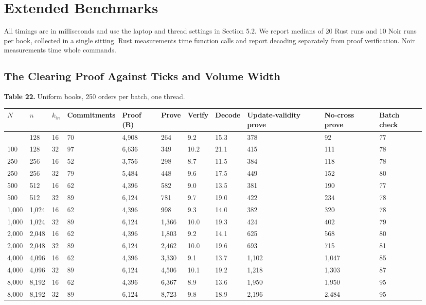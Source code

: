 
\section{Extended Benchmarks}

All timings are in milliseconds and use the laptop and thread settings in Section 5.2. We report medians of 20 Rust runs and 10 Noir runs per book, collected in a single sitting. Rust measurements time function calls and report decoding separately from proof verification. Noir measurements time whole commands.

\subsection{The Clearing Proof Against Ticks and Volume Width}

\textbf{Table 22.} Uniform books, 250 orders per batch, one thread.

\begin{longtable}[]{@{}lllllllllll@{}}
\toprule\noalign{}
\(N\) & \(n\) & \(k_{in}\) & Commitments & Proof (B) & Prove & Verify & Decode & Update-validity prove & No-cross prove & Batch check \\
\midrule\noalign{}
\endhead
\bottomrule\noalign{}
\endlastfoot
100 & 128 & 16 & 70 & 4,908 & 264 & 9.2 & 15.3 & 378 & 92 & 77 \\
100 & 128 & 32 & 97 & 6,636 & 349 & 10.2 & 21.1 & 415 & 111 & 78 \\
250 & 256 & 16 & 52 & 3,756 & 298 & 8.7 & 11.5 & 384 & 118 & 78 \\
250 & 256 & 32 & 79 & 5,484 & 448 & 9.6 & 17.5 & 449 & 152 & 80 \\
500 & 512 & 16 & 62 & 4,396 & 582 & 9.0 & 13.5 & 381 & 190 & 77 \\
500 & 512 & 32 & 89 & 6,124 & 781 & 9.7 & 19.0 & 422 & 234 & 78 \\
1,000 & 1,024 & 16 & 62 & 4,396 & 998 & 9.3 & 14.0 & 382 & 320 & 78 \\
1,000 & 1,024 & 32 & 89 & 6,124 & 1,366 & 10.0 & 19.3 & 424 & 402 & 79 \\
2,000 & 2,048 & 16 & 62 & 4,396 & 1,803 & 9.2 & 14.1 & 625 & 568 & 80 \\
2,000 & 2,048 & 32 & 89 & 6,124 & 2,462 & 10.0 & 19.6 & 693 & 715 & 81 \\
4,000 & 4,096 & 16 & 62 & 4,396 & 3,330 & 9.1 & 13.7 & 1,102 & 1,047 & 85 \\
4,000 & 4,096 & 32 & 89 & 6,124 & 4,506 & 10.1 & 19.2 & 1,218 & 1,303 & 87 \\
8,000 & 8,192 & 16 & 62 & 4,396 & 6,367 & 8.9 & 13.6 & 1,950 & 1,950 & 95 \\
8,000 & 8,192 & 32 & 89 & 6,124 & 8,723 & 9.8 & 18.9 & 2,196 & 2,484 & 95 \\
\end{longtable}

